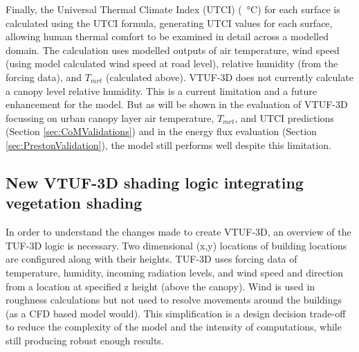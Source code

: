 \documentclass[final,3p,times,authoryear]{elsarticle}
\begin{document}
Finally, the Universal Thermal Climate Index (UTCI) (\SI{}{\degreeCelsius}) for each surface is calculated using the \cite{Brode2009u} UTCI formula, generating UTCI values for each surface, allowing human thermal comfort to be examined in detail across a modelled domain. The calculation uses modelled outputs of air temperature, wind speed (using model calculated wind speed at road level), relative humidity (from the forcing data), and $T_{mrt}$ (calculated above). VTUF-3D does not currently calculate a canopy level relative humidity. This is a current limitation and a future enhancement for the model. But as will be shown in the evaluation of VTUF-3D focussing on urban canopy layer air temperature, $T_{mrt}$, and UTCI predictions (Section \ref{sec:CoMValidations}) and in the energy flux evaluation (Section \ref{sec:PrestonValidation}), the model still performs well despite this limitation. 


\subsection{New VTUF-3D shading logic integrating vegetation shading}\label{sec:integration}
In order to understand the changes made to create VTUF-3D, an overview of the TUF-3D logic is necessary. Two dimensional (x,y) locations of building locations are configured along with their heights. TUF-3D uses forcing data of temperature, humidity, incoming radiation levels, and wind speed and direction from a location at specified z height (above the canopy). Wind is used in roughness calculations but not used to resolve movements around the buildings (as a CFD based model would). This simplification is a design decision trade-off to reduce the complexity of the model and the intensity of computations, while still producing robust enough results.
\end{document}
